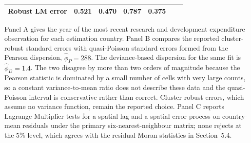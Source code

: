 \begin{table}[!t]
\begin{tabular*}{\textwidth}{@{\extracolsep\fill}l r r r r r r@{}}
Robust LM error & 0.521 & 0.470 & 0.787 & 0.375 & \\
\bottomrule
\end{tabular*}
\begin{tablenotes}
\item[] Panel A gives the year of the most recent research and development expenditure observation for each estimation country. Panel B compares the reported cluster-robust standard errors with quasi-Poisson standard errors formed from the Pearson dispersion, $\hat\phi_{P} = 288$. The deviance-based dispersion for the same fit is $\hat\phi_{D} = 1.4$. The two disagree by more than two orders of magnitude because the Pearson statistic is dominated by a small number of cells with very large counts, so a constant variance-to-mean ratio does not describe these data and the quasi-Poisson interval is conservative rather than correct. Cluster-robust errors, which assume no variance function, remain the reported choice. Panel C reports Lagrange Multiplier tests for a spatial lag and a spatial error process on country-mean residuals under the primary six-nearest-neighbour matrix; none rejects at the 5\% level, which agrees with the residual Moran statistics in Section~5.4.
\end{tablenotes}
\end{table}
